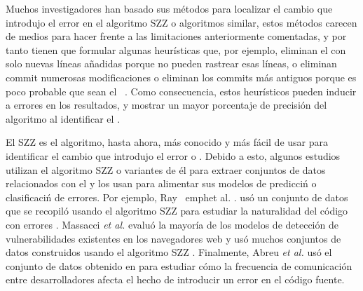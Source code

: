 \documentclass[a4paper, 12pt]{book}
\begin{document}
Muchos investigadores han basado sus m\'etodos para localizar el cambio que introdujo el error en el algoritmo SZZ o algoritmos similar, estos m\'etodos  carecen de medios para hacer frente a las limitaciones anteriormente comentadas, y por tanto tienen que formular algunas heur\'isticas que, por ejemplo, eliminan el \BFC con solo nuevas l\'ineas a\~nadidas porque no pueden rastrear esas l\'ineas, o eliminan commit numerosas modificaciones o eliminan los commits m\'as antiguos porque es poco probable que sean el \BIC ~\cite{da2016framework}. Como consecuencia, estos heur\'isticos pueden inducir a errores en los resultados, y mostrar un mayor porcentaje de precisi\'on del algoritmo al identificar el \BIC.

El SZZ es el algoritmo, hasta ahora, m\'as conocido y m\'as f\'acil de usar para identificar el cambio que introdujo el error o \BIC. Debido a esto, algunos estudios utilizan el algoritmo SZZ o variantes de \'el para extraer conjuntos de datos relacionados con el \BIC y los usan para alimentar sus modelos de predicci\'n o clasificaci\'n de errores. Por ejemplo,  Ray \ emph{et al. .} us\'o un conjunto de datos que se recopil\'o usando el algoritmo SZZ para estudiar la naturalidad del c\'odigo con errores \cite{rahman2014comparing}. Massacci \emph{et al. } evalu\'o la mayor\'ia de los modelos de detecci\'on de vulnerabilidades existentes en los navegadores web y us\'o muchos conjuntos de datos construidos usando el algoritmo SZZ \cite{massacci2014empirical}. Finalmente, Abreu \emph{et al.} us\'o el conjunto de datos obtenido en \cite{abreu2009practical} para estudiar c\'omo la frecuencia de comunicaci\'on entre desarrolladores afecta el hecho de introducir un error en el c\'odigo fuente.
\end{document}
